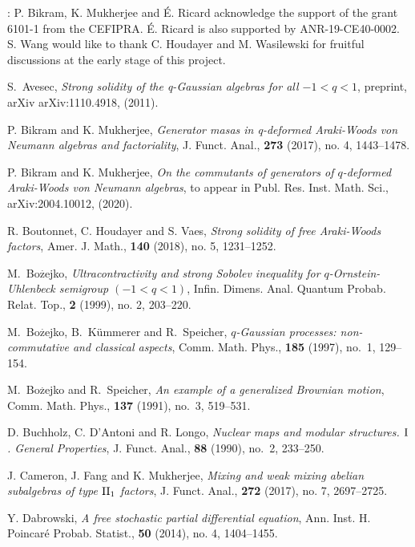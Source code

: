 \documentclass[12pt, a4paper,reqno]{amsart}
\theoremstyle{definition}
\begin{document}
$$ $$
: P. Bikram, K. Mukherjee and
\'{E}. Ricard acknowledge the support of the grant 6101-1 from the
CEFIPRA. \'{E}. Ricard is also supported by ANR-19-CE40-0002. S. Wang
would like to thank C. Houdayer and M. Wasilewski for fruitful
discussions at the early stage of this project.

\begin{thebibliography}{}
\nocite{*}
S.~Avesec, \emph{Strong solidity of the q-Gaussian algebras for all $-1<q<1$}, preprint, arXiv arXiv:1110.4918, (2011).
	
P. Bikram and K. Mukherjee, \emph{ Generator masas in q-deformed Araki-Woods von Neumann algebras and factoriality}, J. Funct. Anal., \textbf{273} (2017), no. 4, 1443--1478.

P. Bikram and K. Mukherjee, \emph{On the commutants of  generators of $q$-deformed  Araki-Woods von Neumann algebras}, to appear in Publ. Res. Inst. Math. Sci., arXiv:2004.10012, (2020).

	
R. Boutonnet, C. Houdayer and S. Vaes, \emph{Strong solidity of free Araki-Woods factors}, Amer. J. Math.,  \textbf{140} (2018), no. 5, 1231--1252.

M.~Bo$\overset{.}{\text{z}}$ejko, \emph{ Ultracontractivity and strong Sobolev inequality for $q$-Ornstein-Uhlenbeck semigroup $(-1<q<1)$}, Infin. Dimens. Anal. Quantum Probab. Relat. Top., \textbf{2} (1999), no. 2, 203–220. 
        
M.~Bo$\overset{.}{\text{z}}$ejko, B.~K\"{u}mmerer and R.~Speicher, \emph{{$q$}-{G}aussian processes: non-commutative and classical aspects}, Comm. Math. Phys., \textbf{185} (1997), no.~1, 129--154.
	
M.~Bo$\overset{.}{\text{z}}$ejko and R.~Speicher, \emph{An example of a generalized {B}rownian motion}, Comm. Math. Phys., \textbf{137} (1991), no.~3, 519--531. 

D. Buchholz, C. D'Antoni and R. Longo, \emph{Nuclear maps and modular structures. $\rm{I}$. General Properties}, J. Funct. Anal., \textbf{88} (1990), no.~2, 233--250.

		
J. Cameron, J. Fang and K. Mukherjee, \emph{Mixing and weak mixing abelian subalgebras of type $\rm{II}_1$ factors}, J. Funct. Anal., \textbf{272} (2017), no. 7, 2697--2725.   
	
Y. Dabrowski,  \emph{A free stochastic partial differential equation},  Ann. Inst. H. Poincar{\'e} Probab. Statist., \textbf{50} (2014), no. 4, 1404--1455.


\end{thebibliography}
\end{document}
